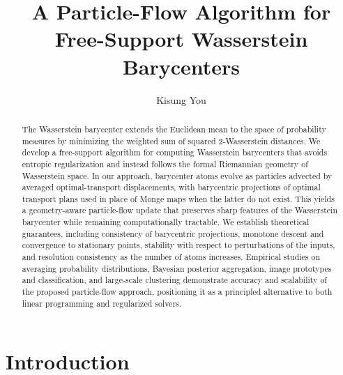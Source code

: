 \documentclass[11pt]{article}
\begin{document}
	
\title{A Particle-Flow Algorithm for Free-Support Wasserstein Barycenters}
\author[1]{Kisung You}
\date{}

\maketitle
\begin{abstract}
The Wasserstein barycenter extends the Euclidean mean to the space of probability measures by minimizing the weighted sum of squared 2-Wasserstein distances. We develop a free-support algorithm for computing Wasserstein barycenters that avoids entropic regularization and instead follows the formal Riemannian geometry of Wasserstein space. In our approach, barycenter atoms evolve as particles advected by averaged optimal-transport displacements, with barycentric projections of optimal transport plans used in place of Monge maps when the latter do not exist. This yields a geometry-aware particle-flow update that preserves sharp features of the Wasserstein barycenter while remaining computationally tractable. We establish theoretical guarantees, including consistency of barycentric projections, monotone descent and convergence to stationary points, stability with respect to perturbations of the inputs, and resolution consistency as the number of atoms increases. Empirical studies on averaging probability distributions, Bayesian posterior aggregation, image prototypes and classification, and large-scale clustering demonstrate accuracy and scalability of the proposed particle-flow approach, positioning it as a principled alternative to both linear programming and regularized solvers.
\end{abstract}



\section{Introduction}
\end{document}
